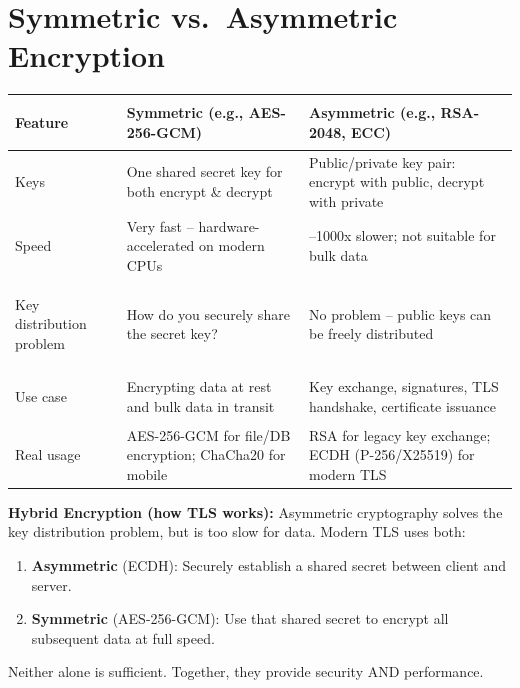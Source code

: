\documentclass[11pt, letterpaper]{article}
\begin{document}
\vspace{8pt}

\section*{Symmetric vs.\ Asymmetric Encryption}

\noindent
{\renewcommand{\arraystretch}{1.6}
\begin{tabularx}{\textwidth}{>{\bfseries\raggedright\arraybackslash}p{4cm}
                              >{\raggedright\arraybackslash}X
                              >{\raggedright\arraybackslash}X}
\toprule
\rowcolor{tableheaderteal}
\textbf{Feature} & \textbf{Symmetric (e.g., AES-256-GCM)} & \textbf{Asymmetric (e.g., RSA-2048, ECC)} \\
\midrule
\rowcolor{rowTe} Keys      & One shared secret key for both encrypt \& decrypt & Public/private key pair: encrypt with public, decrypt with private \\
\rowcolor{rowA}  Speed     & Very fast -- hardware-accelerated on modern CPUs & 100--1000x slower; not suitable for bulk data \\
\rowcolor{rowTe} Key distribution problem & How do you securely share the secret key? & No problem -- public keys can be freely distributed \\
\rowcolor{rowA}  Use case  & Encrypting data at rest and bulk data in transit & Key exchange, signatures, TLS handshake, certificate issuance \\
\rowcolor{rowTe} Real usage & AES-256-GCM for file/DB encryption; ChaCha20 for mobile & RSA for legacy key exchange; ECDH (P-256/X25519) for modern TLS \\
\bottomrule
\end{tabularx}}

\begin{tcolorbox}[colback=part5bg, colframe=sectionteal, arc=3pt, boxrule=1pt]
\textbf{Hybrid Encryption (how TLS works):} Asymmetric cryptography solves the key distribution problem, but is too slow for data. Modern TLS uses both:
\begin{enumerate}[noitemsep, leftmargin=*]
  \item \textbf{Asymmetric} (ECDH): Securely establish a shared secret between client and server.
  \item \textbf{Symmetric} (AES-256-GCM): Use that shared secret to encrypt all subsequent data at full speed.
\end{enumerate}
Neither alone is sufficient. Together, they provide security AND performance.
\end{tcolorbox}
\end{document}
